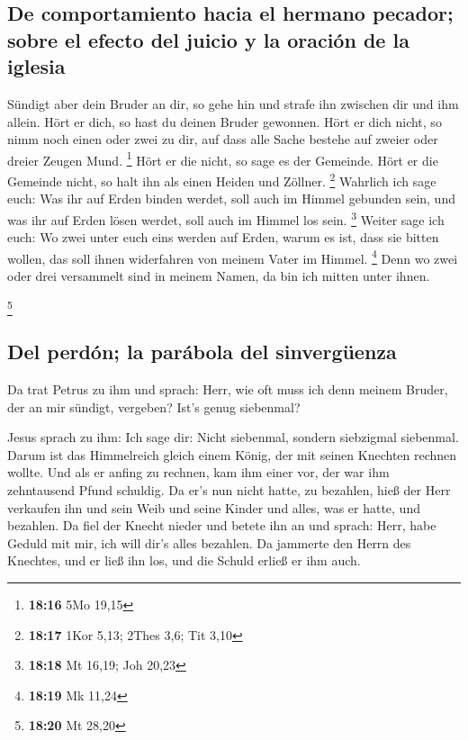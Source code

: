 \hypertarget{de-comportamiento-hacia-el-hermano-pecador-sobre-el-efecto-del-juicio-y-la-oraciuxf3n-de-la-iglesia}{%
\subsection{De comportamiento hacia el hermano pecador; sobre el efecto
del juicio y la oración de la
iglesia}\label{de-comportamiento-hacia-el-hermano-pecador-sobre-el-efecto-del-juicio-y-la-oraciuxf3n-de-la-iglesia}}

 Sündigt aber dein Bruder an dir, so gehe hin und strafe
ihn zwischen dir und ihm allein. Hört er dich, so hast du deinen Bruder
gewonnen.  Hört er dich nicht, so nimm noch einen oder
zwei zu dir, auf dass alle Sache bestehe auf zweier oder dreier Zeugen
Mund. \footnote{\textbf{18:16} 5Mo 19,15}  Hört er die
nicht, so sage es der Gemeinde. Hört er die Gemeinde nicht, so halt ihn
als einen Heiden und Zöllner. \footnote{\textbf{18:17} 1Kor 5,13; 2Thes
  3,6; Tit 3,10}  Wahrlich ich sage euch: Was ihr auf
Erden binden werdet, soll auch im Himmel gebunden sein, und was ihr auf
Erden lösen werdet, soll auch im Himmel los sein. \footnote{\textbf{18:18}
  Mt 16,19; Joh 20,23}  Weiter sage ich euch: Wo zwei
unter euch eins werden auf Erden, warum es ist, dass sie bitten wollen,
das soll ihnen widerfahren von meinem Vater im Himmel. \footnote{\textbf{18:19}
  Mk 11,24}  Denn wo zwei oder drei versammelt sind in
meinem Namen, da bin ich mitten unter ihnen.

\footnote{\textbf{18:20} Mt 28,20}

\hypertarget{del-perduxf3n-la-paruxe1bola-del-sinverguxfcenza}{%
\subsection{Del perdón; la parábola del
sinvergüenza}\label{del-perduxf3n-la-paruxe1bola-del-sinverguxfcenza}}

 Da trat Petrus zu ihm und sprach: Herr, wie oft muss ich
denn meinem Bruder, der an mir sündigt, vergeben? Ist's genug siebenmal?

 Jesus sprach zu ihm: Ich sage dir: Nicht siebenmal,
sondern siebzigmal siebenmal.  Darum ist das Himmelreich
gleich einem König, der mit seinen Knechten rechnen wollte.
 Und als er anfing zu rechnen, kam ihm einer vor, der war
ihm zehntausend Pfund schuldig.  Da er's nun nicht hatte,
zu bezahlen, hieß der Herr verkaufen ihn und sein Weib und seine Kinder
und alles, was er hatte, und bezahlen.  Da fiel der
Knecht nieder und betete ihn an und sprach: Herr, habe Geduld mit mir,
ich will dir's alles bezahlen.  Da jammerte den Herrn des
Knechtes, und er ließ ihn los, und die Schuld erließ er ihm auch.


